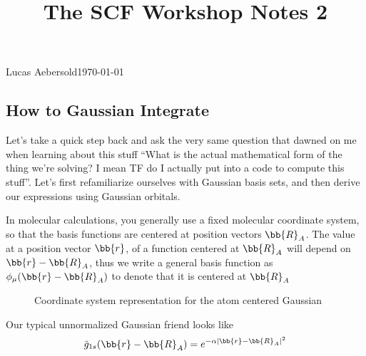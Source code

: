 \documentclass[11pt]{article}
\begin{document}
\title{The SCF Workshop Notes 2}{Lucas Aebersold}{\today}
\setcounter{section}{2}
\subsection{How to Gaussian Integrate}
Let's take a quick step back and ask the very same question that dawned on me when learning about this stuff ``What is the actual mathematical form of the thing we're solving? I mean TF do I actually put into a code to compute this stuff''. Let's first refamiliarize ourselves with Gaussian basis sets, and then derive our expressions using Gaussian orbitals. 

In molecular calculations, you generally use a fixed molecular coordinate system, so that the basis functions are centered at position vectors $\bb{R}_A$. The value at a position vector $\bb{r}$, of a function centered at $\bb{R}_A$ will depend on $\bb{r} - \bb{R}_A$, thus we write a general basis function as $\phi_\mu (\bb{r} - \bb{R}_A)$ to denote that it is centered at $\bb{R}_A$
\begin{figure}[H]
	\centering
{}
\caption{Coordinate system representation for the atom centered Gaussian}
\end{figure}
Our typical unnormalized Gaussian friend looks like
\begin{equation}\label{key}
\tilde{g}_{1s} (\bb{r} - \bb{R}_A) = e^{-\alpha | \bb{r} - \bb{R}_A|^2} 
\end{equation}
\end{document}
